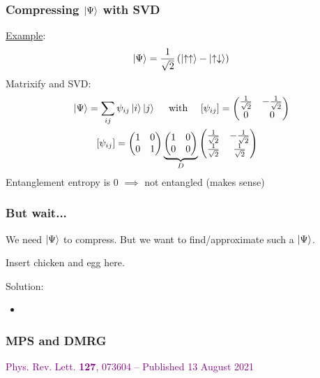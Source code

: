 \documentclass{beamer}
\theoremstyle{definition}
\newcommand{\lp}{\left(}
\newcommand{\rp}{\right)}
\newcommand{\f}[2]{\frac{#1}{#2}}
\begin{document}
\begin{frame}
	\frametitle{Compressing $\ket{\Psi}$ with SVD}
	
	\underline{Example}:  
	\begin{align*}
		\ket{\Psi} = \f{1}{\sqrt{2}}\lp \ket{\uparrow\uparrow} - \ket{\uparrow\downarrow} \rp
	\end{align*}
	Matrixify and SVD:
	\begin{align*}
	&\ket{\Psi} = \sum_{ij}\psi_{ij}\ket{i}\ket{j} \quad \text{ with } \quad   [\psi_{ij}] = \begin{pmatrix}
			\f{1}{\sqrt{2}} & -\f{1}{\sqrt{2}} \\ 0 & 0
		\end{pmatrix}\\
	&\quad\quad \,\,\,[\psi_{ij}] = \begin{pmatrix}
			1 & 0 \\ 0 & 1
		\end{pmatrix}
	\underbrace{\begin{pmatrix}
		1 & 0 \\ 0 & 0 
	\end{pmatrix}}_D
	\begin{pmatrix}
		\f{1}{\sqrt{2}} & -\f{1}{\sqrt{2}} \\ 	\f{1}{\sqrt{2}} & \f{1}{\sqrt{2}}
	\end{pmatrix}
	\end{align*}
	Entanglement entropy is 0 $\implies$ not entangled (makes sense)
\end{frame}



\begin{frame}
	\frametitle{But wait...}
	
	We need $\ket{\Psi}$ to compress. But we want to find/approximate such a $\ket{\Psi}$. \\
	
	\vspace{8pt}
	
	Insert chicken and egg here.\\
	
	\vspace{8pt}
	
	Solution:
	\begin{itemize}
		\item 
	\end{itemize}
\end{frame}


\begin{frame}
	\frametitle{MPS and DMRG}
\end{frame}



 





\begin{frame}
\textcolor{purple}{{Phys. Rev. Lett. \textbf{127}, 073604 – Published 13 August 2021}}
\end{frame}
\end{document}
